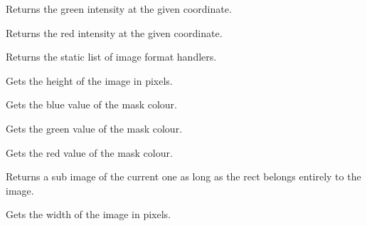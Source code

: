 \label{wximagegetgreen}


Returns the green intensity at the given coordinate.

\label{wximagegetred}


Returns the red intensity at the given coordinate.



Returns the static list of image format handlers.



\label{wximagegetheight}


Gets the height of the image in pixels.

\label{wximagegetmaskblue}


Gets the blue value of the mask colour.

\label{wximagegetmaskgreen}


Gets the green value of the mask colour.

\label{wximagegetmaskred}


Gets the red value of the mask colour.

\label{wximagegetsubimage}


Returns a sub image of the current one as long as the rect belongs entirely to 
the image.

\label{wximagegetwidth}


Gets the width of the image in pixels.

